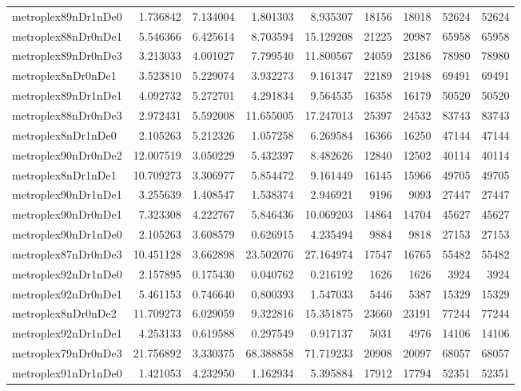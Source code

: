 \begin{longtable}{|l|r|r|r|r|r|r|r|r|}
metroplex89nDr1nDe0 & 1.736842 & 7.134004 & 1.801303 & 8.935307 & 18156 & 18018 & 52624 & 52624 \\
metroplex88nDr0nDe1 & 5.546366 & 6.425614 & 8.703594 & 15.129208 & 21225 & 20987 & 65958 & 65958 \\
metroplex89nDr0nDe3 & 3.213033 & 4.001027 & 7.799540 & 11.800567 & 24059 & 23186 & 78980 & 78980 \\
metroplex8nDr0nDe1 & 3.523810 & 5.229074 & 3.932273 & 9.161347 & 22189 & 21948 & 69491 & 69491 \\
metroplex89nDr1nDe1 & 4.092732 & 5.272701 & 4.291834 & 9.564535 & 16358 & 16179 & 50520 & 50520 \\
metroplex88nDr0nDe3 & 2.972431 & 5.592008 & 11.655005 & 17.247013 & 25397 & 24532 & 83743 & 83743 \\
metroplex8nDr1nDe0 & 2.105263 & 5.212326 & 1.057258 & 6.269584 & 16366 & 16250 & 47144 & 47144 \\
metroplex90nDr0nDe2 & 12.007519 & 3.050229 & 5.432397 & 8.482626 & 12840 & 12502 & 40114 & 40114 \\
metroplex8nDr1nDe1 & 10.709273 & 3.306977 & 5.854472 & 9.161449 & 16145 & 15966 & 49705 & 49705 \\
metroplex90nDr1nDe1 & 3.255639 & 1.408547 & 1.538374 & 2.946921 & 9196 & 9093 & 27447 & 27447 \\
metroplex90nDr0nDe1 & 7.323308 & 4.222767 & 5.846436 & 10.069203 & 14864 & 14704 & 45627 & 45627 \\
metroplex90nDr1nDe0 & 2.105263 & 3.608579 & 0.626915 & 4.235494 & 9884 & 9818 & 27153 & 27153 \\
metroplex87nDr0nDe3 & 10.451128 & 3.662898 & 23.502076 & 27.164974 & 17547 & 16765 & 55482 & 55482 \\
metroplex92nDr1nDe0 & 2.157895 & 0.175430 & 0.040762 & 0.216192 & 1626 & 1626 & 3924 & 3924 \\
metroplex92nDr0nDe1 & 5.461153 & 0.746640 & 0.800393 & 1.547033 & 5446 & 5387 & 15329 & 15329 \\
metroplex8nDr0nDe2 & 11.709273 & 6.029059 & 9.322816 & 15.351875 & 23660 & 23191 & 77244 & 77244 \\
metroplex92nDr1nDe1 & 4.253133 & 0.619588 & 0.297549 & 0.917137 & 5031 & 4976 & 14106 & 14106 \\
metroplex79nDr0nDe3 & 21.756892 & 3.330375 & 68.388858 & 71.719233 & 20908 & 20097 & 68057 & 68057 \\
metroplex91nDr1nDe0 & 1.421053 & 4.232950 & 1.162934 & 5.395884 & 17912 & 17794 & 52351 & 52351 \\

\end{longtable}
